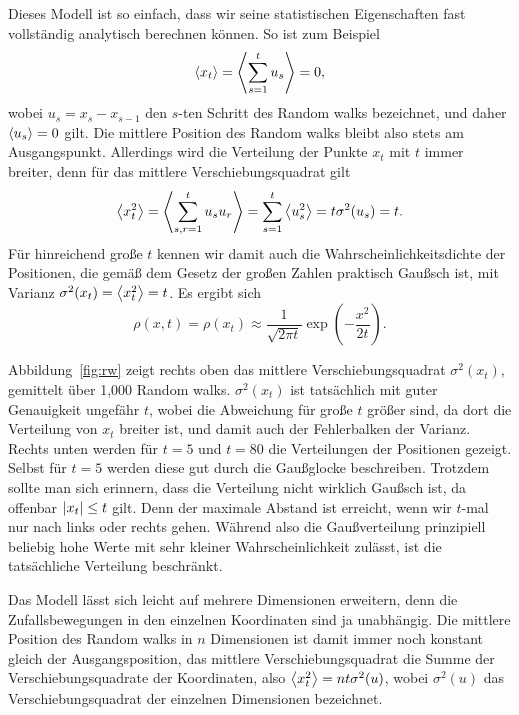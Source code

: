 Dieses Modell ist so einfach, dass wir seine statistischen
Eigenschaften fast vollständig analytisch berechnen können. So ist zum
Beispiel
\begin{equation}
  \left\langle{x_t}\right\rangle = \left\langle{\sum_{s=1}^{t} u_s}\right\rangle = 0, 
\end{equation}
wobei $u_{s} = x_{s} - x_{s-1}$ den $s$-ten Schritt des Random walks
bezeichnet, und daher $\left\langle{u_s}\right\rangle = 0$ gilt. Die mittlere Position des
Random walks bleibt also stets am Ausgangspunkt. Allerdings wird die
Verteilung der Punkte $x_t$ mit $t$ immer breiter, denn für das
mittlere Verschiebungsquadrat gilt
\begin{equation}
  \label{eq:sigmarw}
  \left\langle{x_t^2}\right\rangle =
  \left\langle{\sum_{s,r=1}^{t} u_su_r}\right\rangle = \sum_{s=1}^{t}\left\langle{u_s^2}\right\rangle
  = t\sigma^2(u_s) = t.
\end{equation}
Für hinreichend große $t$ kennen wir damit auch die
Wahrscheinlichkeitsdichte der Positionen, die gemäß dem Gesetz der
großen Zahlen praktisch Gaußsch ist, mit Varianz $\sigma^2(x_t) =
\left\langle{x_t^2}\right\rangle = t$. Es ergibt sich
\begin{equation}
  \rho(x, t) = \rho(x_t) \approx \frac{1}{\sqrt{2\pi t}}
  \exp\left(-\frac{x^2}{2t}\right).
\end{equation}

Abbildung~\ref{fig:rw} zeigt rechts oben das mittlere
Verschiebungsquadrat $\sigma^2(x_t)$, gemittelt über 1,000 Random
walks. $\sigma^2(x_t)$ ist tatsächlich mit guter Genauigkeit ungefähr
$t$, wobei die Abweichung für große $t$ größer sind, da dort die
Verteilung von $x_t$ breiter ist, und damit auch der Fehlerbalken der
Varianz. Rechts unten werden für $t=5$ und $t=80$ die Verteilungen der
Positionen gezeigt. Selbst für $t=5$ werden diese gut durch die
Gaußglocke beschreiben.  Trotzdem sollte man sich erinnern, dass die
Verteilung nicht wirklich Gaußsch ist, da offenbar $\left\lvert{x_t}\right\rvert\le t$
gilt. Denn der maximale Abstand ist erreicht, wenn wir $t$-mal nur
nach links oder rechts gehen. Während also die Gaußverteilung
prinzipiell beliebig hohe Werte mit sehr kleiner Wahrscheinlichkeit
zulässt, ist die tatsächliche Verteilung beschränkt.

Das Modell lässt sich leicht auf mehrere Dimensionen erweitern, denn
die Zufallsbewegungen in den einzelnen Koordinaten sind ja
unabhängig. Die mittlere Position des Random walks in $n$ Dimensionen
ist damit immer noch konstant gleich der Ausgangsposition, das
mittlere Verschiebungsquadrat die Summe der Verschiebungsquadrate der
Koordinaten, also $\left\langle{x_t^2}\right\rangle = n t \sigma^2(u)$, wobei
$\sigma^2(u)$ das Verschiebungsquadrat der einzelnen Dimensionen
bezeichnet.

